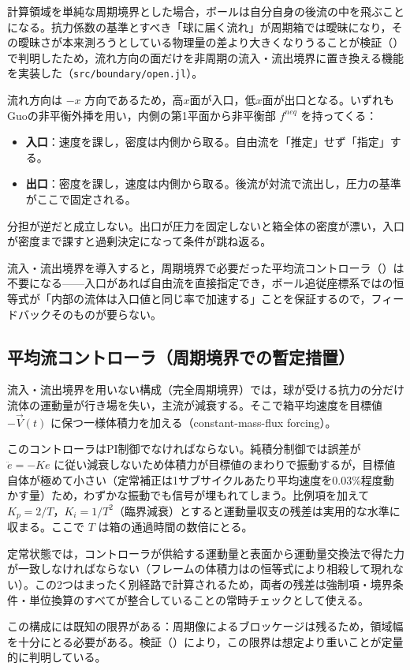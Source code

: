 計算領域を単純な周期境界とした場合，ボールは自分自身の後流の中を飛ぶことになる。抗力係数の基準とすべき「球に届く流れ」が周期箱では曖昧になり，その曖昧さが本来測ろうとしている物理量の差より大きくなりうることが検証（）で判明したため，流れ方向の面だけを非周期の流入・流出境界に置き換える機能を実装した（\texttt{src/boundary/open.jl}）。

流れ方向は \(-x\) 方向であるため，高\(x\)面が入口，低\(x\)面が出口となる。いずれもGuoの非平衡外挿を用い，内側の第1平面から非平衡部 \(f^{neq}\) を持ってくる：

\begin{itemize}
	\item \textbf{入口}：速度を課し，密度は内側から取る。自由流を「推定」せず「指定」する。
	\item \textbf{出口}：密度を課し，速度は内側から取る。後流が対流で流出し，圧力の基準がここで固定される。
\end{itemize}

分担が逆だと成立しない。出口が圧力を固定しないと箱全体の密度が漂い，入口が密度まで課すと過剰決定になって条件が跳ね返る。

流入・流出境界を導入すると，周期境界で必要だった平均流コントローラ（）は不要になる——入口があれば自由流を直接指定でき，ボール追従座標系ではの恒等式が「内部の流体は入口値と同じ率で加速する」ことを保証するので，フィードバックそのものが要らない。

\subsection{平均流コントローラ（周期境界での暫定措置）}
\label{sec:controller}

流入・流出境界を用いない構成（完全周期境界）では，球が受ける抗力の分だけ流体の運動量が行き場を失い，主流が減衰する。そこで箱平均速度を目標値 \(-\vec V(t)\) に保つ一様体積力を加える（constant-mass-flux forcing）。

このコントローラはPI制御でなければならない。純積分制御では誤差が \(\ddot e=-Ke\) に従い減衰しないため体積力が目標値のまわりで振動するが，目標値自体が極めて小さい（定常補正は1サブサイクルあたり平均速度を0.03\%程度動かす量）ため，わずかな振動でも信号が埋もれてしまう。比例項を加えて \(K_p=2/T\)，\(K_i=1/T^2\)（臨界減衰）とすると運動量収支の残差は実用的な水準に収まる。ここで \(T\) は箱の通過時間の数倍にとる。

定常状態では，コントローラが供給する運動量と表面から運動量交換法で得た力が一致しなければならない（フレームの体積力はの恒等式により相殺して現れない）。この2つはまったく別経路で計算されるため，両者の残差は強制項・境界条件・単位換算のすべてが整合していることの常時チェックとして使える。

この構成には既知の限界がある：周期像によるブロッケージは残るため，領域幅を十分にとる必要がある。検証（）により，この限界は想定より重いことが定量的に判明している。
